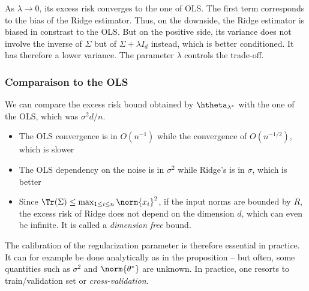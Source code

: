 \documentclass[toc, titlepaged]{../cs-classes/cs-classes}
\begin{document}
\begin{remark}
    As $\lambda\to0$, its excess risk converges to the one of OLS. The first term corresponds to the bias of the Ridge estimator. Thus, on the downside, the Ridge estimator is biased in constrast to the OLS. But on the positive side, its variance does not involve the inverse of $\Sigma$ but of $\Sigma+\lambda I_d$ instead, which is better conditioned. It has therefore a lower variance. The parameter $\lambda$ controls the trade-off.
\end{remark}

\subsubsection{Comparaison to the OLS}
We can compare the excess risk bound obtained by $\htheta_{\lambda^*}$ with the one of the OLS, which was $\sigma^2d/n$.
\begin{itemize}
    \item The OLS convergence is in $O(n^{-1})$ while the convergence of $O(n^{-1/2})$, which is slower
    \item The OLS dependency on the noise is in $\sigma^2$ while Ridge's is in $\sigma$, which is better
    \item Since $\Tr(\Sigma)\leq\max_{1\leq i\leq n}\norm{x_i}^2$, if the input norms are bounded by $R$, the excess risk of Ridge does not depend on the dimension $d$, which can even be infinite. It is called a \emph{dimension free} bound.
\end{itemize}
The calibration of the regularization parameter is therefore essential in practice. It can for example be done analytically as in the proposition -- but often, some quantities such as $\sigma^2$ and $\norm{\theta^*}$ are unknown. In practice, one resorts to train/validation set or \emph{cross-validation}.
\end{document}
